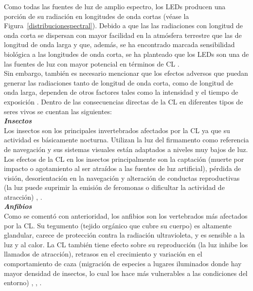 Como todas las fuentes de luz de amplio espectro, los LEDs producen una porción de su radiación en longitudes de onda cortas (véase la Figura~\ref{distribucionespectral}). Debido a que las las radiaciones con longitud de onda corta se dispersan con mayor facilidad en la atmósfera terrestre que las de longitud de onda larga y que, además, se ha encontrado marcada sensibilidad biológica a las longitudes de onda corta, se ha planteado que los LEDs son una de las fuentes de luz con mayor potencial en términos de CL \citep{USENERGY2017}.\\

Sin embargo, también es necesario mencionar que los efectos adversos que puedan generar las radiaciones tanto de longitud de onda corta, como de longitud de onda larga, dependen de otros factores tales como la intensidad y el tiempo de exposición \citep{Globaldiscussion}. Dentro de las consecuencias directas de la CL en diferentes tipos de seres vivos se cuentan las siguientes:\\


\textit{\textbf{Insectos}}\\

Los insectos son los principales invertebrados afectados por la CL ya que su actividad es básicamente nocturna. Utilizan  la luz del firmamento como referencia de navegación y sus sistemas visuales están adaptados a niveles muy bajos de luz. Los efectos de la CL en los insectos principalmente son la captación (muerte por impacto o agotamiento al ser atraídos a las fuentes de luz artificial), pérdida de visión, desorientación en la navegación y alteración de conductas reproductivas (la luz puede suprimir la emisión de feromonas o dificultar la actividad de atracción) \citep{CEI2017}, \citep{Davies2013}.\\

\textit{\textbf{Anfibios}}\\

Como se comentó con anterioridad, los anfibios son los vertebrados más afectados por la CL. Su tegumento (tejido orgánico que cubre su cuerpo) es altamente glandular, carece de protección contra la radiación ultravioleta, y es sensible a la luz y al calor. La CL también tiene efecto sobre su reproducción (la luz inhibe los llamados de atracción), retrasos en el crecimiento y variación en el comportamiento de caza (migración de especies a lugares iluminados donde hay mayor densidad de insectos, lo cual los hace más vulnerables a las condiciones del entorno) \citep{Longcore2006}, \citep{LibroCL}, \citep{LibroCL}.\\

